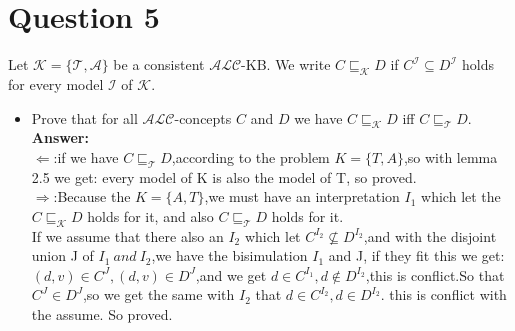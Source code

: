 \documentclass{article}
\begin{document}
    \section{Question 5}
    Let $\mathcal{K}=\{\mathcal{T}, \mathcal{A}\}$ be a consistent $\mathcal{ALC}$-KB. We write $C\sqsubseteq_{\mathcal{K}}D$ if $C^{\mathcal{I}}\subseteq D^{\mathcal{I}}$ holds for every model $\mathcal{I}$ of $\mathcal{K}$.
    \begin{itemize}
        \item Prove that for all $\mathcal{ALC}$-concepts $C$ and $D$ we have $C\sqsubseteq_{\mathcal{K}}D$ iff $C\sqsubseteq_{\mathcal{T}}D$.
        \textbf{Answer:}\\
        $\Leftarrow$:if we have $C\sqsubseteq_{\mathcal{T}}D$,according to the problem $K = \{T,A\}$,so with lemma 2.5 we get: every model of K is also the model of T, so proved.\\
        $\Rightarrow$:Because the $K = \{A,T\}$,we must have an interpretation $I_1$ which let the $C\sqsubseteq_{\mathcal{K}}D$ holds for it, and also $C\sqsubseteq_{\mathcal{T}}D$ holds for it.\\
        If we assume that there also an $I_2$ which let $C^{I_2} \nsubseteq  D^{I_2}$,and with the disjoint union J of $I_1\ and \ I_2$,we have the bisimulation $I_1$ and J, if they fit this we get:
        $(d,v) \in C^J,(d,v) \in D^J$,and we get $d \in C^{I_1},d \notin D^{I_2}$,this is conflict.So that $C^J \in D^J$,so we get the same with $I_2$ that $d\in C^{I_2},d\in D^{I_2}$. this is conflict with the assume. So proved.\\
    \end{itemize}
\end{document}
